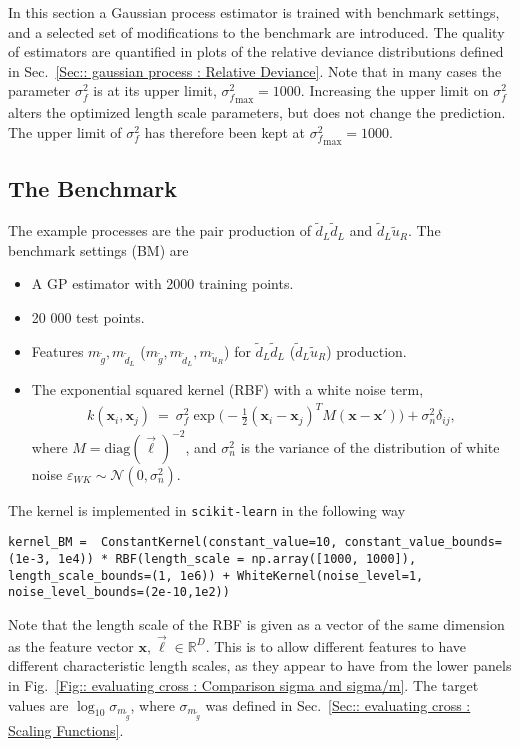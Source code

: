 \documentclass[twoside,english]{uiofysmaster}
\begin{document}
{In this section a Gaussian process estimator is trained with benchmark settings, and a selected set of modifications to the benchmark are introduced. The quality of estimators are quantified in plots of the relative deviance distributions defined in Sec.~\ref{Sec:: gaussian process : Relative Deviance}. Note that in many cases the parameter $\sigma_f^2$ is at its upper limit, ${\sigma_f^2}_{\mathrm{max}} = 1000$. Increasing the upper limit on $\sigma_f^2$ alters the optimized length scale parameters, but does not change the prediction. The upper limit of $\sigma_f^2$ has therefore been kept at ${\sigma_f^2}_{\mathrm{max}} = 1000$.

\subsection{The Benchmark}\label{Sec:: evaluating cross : The Benchmark}

The example processes are the pair production of $\widetilde{d}_L \widetilde{d}_L$ and $\widetilde{d}_L \widetilde{u}_R$. The benchmark settings (BM) are 
\begin{itemize}
\item A GP estimator with 2000 training points.
\item 20 000 test points.
\item Features $m_{\widetilde{g}}, m_{\widetilde{d}_L}$ ($m_{\widetilde{g}}, m_{\widetilde{d}_L}, m_{\widetilde{u}_R}$) for $\widetilde{d}_L \widetilde{d}_L$ ($\widetilde{d}_L \widetilde{u}_R$) production.
\item The exponential squared kernel (RBF) with a white noise term, 
\begin{align}
k(\textbf{x}_i, \textbf{x}_j)~=~\sigma_f^2 \exp \big(-\frac{1}{2} (\textbf{x}_i-\textbf{x}_j)^TM(\textbf{x} - \textbf{x}') \big) + \sigma_n^2 \delta_{ij},
\end{align}
where $M = \textrm{diag}(\vec{\ell})^{-2}$, and $\sigma_n^2$ is the variance of the distribution of white noise $\varepsilon_{WK} \sim \mathcal{N}(0, \sigma_n^2)$.
\end{itemize}
The kernel is implemented in \verb|scikit-learn| in the following way 
\begin{lstlisting}
kernel_BM =  ConstantKernel(constant_value=10, constant_value_bounds=(1e-3, 1e4)) * RBF(length_scale = np.array([1000, 1000]), length_scale_bounds=(1, 1e6)) + WhiteKernel(noise_level=1, noise_level_bounds=(2e-10,1e2))
\end{lstlisting} 
Note that the length scale of the RBF is given as a vector of the same dimension as the feature vector $\textbf{x},\vec{\ell} \in \mathbb{R}^D$. This is to allow different features to have different characteristic length scales, as they appear to have from the lower panels in Fig.~\ref{Fig:: evaluating cross : Comparison sigma and sigma/m}. The target values are $\log_{10} \sigma_{m_{\widetilde{g}}}$, where $\sigma_{m_{\widetilde{g}}}$ was defined in Sec.~\ref{Sec:: evaluating cross : Scaling Functions}.

}
\end{document}
